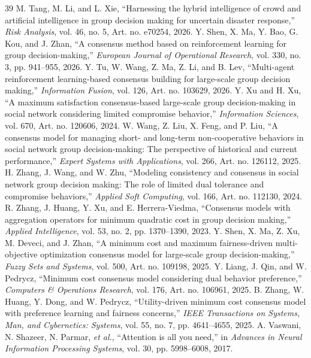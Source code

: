 \documentclass[journal]{IEEEtran}
\begin{document}
\begin{thebibliography}{39}
 M. Tang, M. Li, and L. Xie, ``Harnessing the hybrid intelligence of crowd and artificial intelligence in group decision making for uncertain disaster response,'' \emph{Risk Analysis}, vol. 46, no. 5, Art. no. e70254, 2026.
 Y. Shen, X. Ma, Y. Bao, G. Kou, and J. Zhan, ``A consensus method based on reinforcement learning for group decision-making,'' \emph{European Journal of Operational Research}, vol. 330, no. 3, pp. 941--955, 2026.
 Y. Tu, W. Wang, Z. Ma, Z. Li, and B. Lev, ``Multi-agent reinforcement learning-based consensus building for large-scale group decision making,'' \emph{Information Fusion}, vol. 126, Art. no. 103629, 2026.
 Y. Xu and H. Xu, ``A maximum satisfaction consensus-based large-scale group decision-making in social network considering limited compromise behavior,'' \emph{Information Sciences}, vol. 670, Art. no. 120606, 2024.
 W. Wang, Z. Liu, X. Feng, and P. Liu, ``A consensus model for managing short- and long-term non-cooperative behaviors in social network group decision-making: The perspective of historical and current performance,'' \emph{Expert Systems with Applications}, vol. 266, Art. no. 126112, 2025.
 H. Zhang, J. Wang, and W. Zhu, ``Modeling consistency and consensus in social network group decision making: The role of limited dual tolerance and compromise behaviors,'' \emph{Applied Soft Computing}, vol. 166, Art. no. 112130, 2024.
 R. Zhang, J. Huang, Y. Xu, and E. Herrera-Viedma, ``Consensus models with aggregation operators for minimum quadratic cost in group decision making,'' \emph{Applied Intelligence}, vol. 53, no. 2, pp. 1370--1390, 2023.
 Y. Shen, X. Ma, Z. Xu, M. Deveci, and J. Zhan, ``A minimum cost and maximum fairness-driven multi-objective optimization consensus model for large-scale group decision-making,'' \emph{Fuzzy Sets and Systems}, vol. 500, Art. no. 109198, 2025.
 Y. Liang, J. Qin, and W. Pedrycz, ``Minimum cost consensus model considering dual behavior preference,'' \emph{Computers \& Operations Research}, vol. 176, Art. no. 106961, 2025.
 B. Zhang, W. Huang, Y. Dong, and W. Pedrycz, ``Utility-driven minimum cost consensus model with preference learning and fairness concerns,'' \emph{IEEE Transactions on Systems, Man, and Cybernetics: Systems}, vol. 55, no. 7, pp. 4641--4655, 2025.
 A. Vaswani, N. Shazeer, N. Parmar, \emph{et al.}, ``Attention is all you need,'' in \emph{Advances in Neural Information Processing Systems}, vol. 30, pp. 5998--6008, 2017.

\end{thebibliography}
\end{document}

